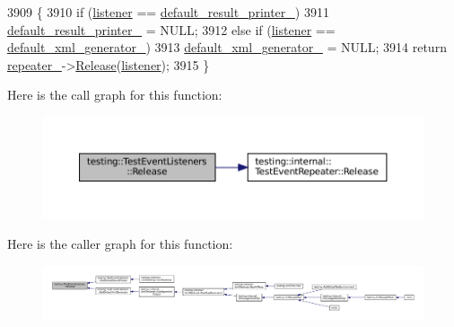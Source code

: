 \begin{DoxyCode}
3909                                                                           \{
3910   \textcolor{keywordflow}{if} (\hyperlink{namespaceinteractive__marker_a0e579ab555212bb5e2c9f8a675b7618a}{listener} == \hyperlink{classtesting_1_1TestEventListeners_a9ff9ebc31a9a52e5f108661cfcb7ecd9}{default\_result\_printer\_})
3911     \hyperlink{classtesting_1_1TestEventListeners_a9ff9ebc31a9a52e5f108661cfcb7ecd9}{default\_result\_printer\_} = NULL;
3912   \textcolor{keywordflow}{else} \textcolor{keywordflow}{if} (\hyperlink{namespaceinteractive__marker_a0e579ab555212bb5e2c9f8a675b7618a}{listener} == \hyperlink{classtesting_1_1TestEventListeners_a018a3952aa10c19251b88f27abe373d3}{default\_xml\_generator\_})
3913     \hyperlink{classtesting_1_1TestEventListeners_a018a3952aa10c19251b88f27abe373d3}{default\_xml\_generator\_} = NULL;
3914   \textcolor{keywordflow}{return} \hyperlink{classtesting_1_1TestEventListeners_a625d58b951893e80cde12862aece6fd8}{repeater\_}->\hyperlink{classtesting_1_1internal_1_1TestEventRepeater_ac77a3d127e4726e11694e4ee9cf3b793}{Release}(\hyperlink{namespaceinteractive__marker_a0e579ab555212bb5e2c9f8a675b7618a}{listener});
3915 \}
\end{DoxyCode}
Here is the call graph for this function\+:
\nopagebreak
\begin{figure}[H]
\begin{center}
\leavevmode
\includegraphics[width=350pt]{classtesting_1_1TestEventListeners_a038c9fa1975f84d6f3d25b52bc7bccdd_cgraph}
\end{center}
\end{figure}
Here is the caller graph for this function\+:
\nopagebreak
\begin{figure}[H]
\begin{center}
\leavevmode
\includegraphics[width=350pt]{classtesting_1_1TestEventListeners_a038c9fa1975f84d6f3d25b52bc7bccdd_icgraph}
\end{center}
\end{figure}
\mbox{\label{classtesting_1_1TestEventListeners_ad28af964081553de465fbfc1c5a46650}} 
